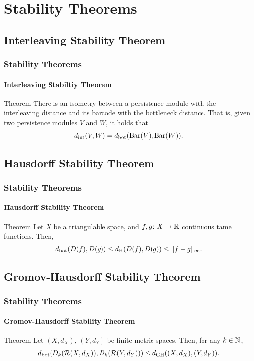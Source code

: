 \documentclass[aspectratio=169]{beamer}
\begin{document}
\section{Stability Theorems}

\subsection{Interleaving Stability Theorem}

\begin{frame}
  \frametitle{Stability Theorems}
  \framesubtitle{Interleaving Stabiltiy Theorem}
  
  \begin{block}{Theorem}
    There is an isometry between a persistence module with the interleaving distance and its barcode with the bottleneck distance. That is, given two persistence modules $ V $ and $ W $, it holds that
    \begin{equation}
        d_{\operatorname{int}} (V, W) = d_{\operatorname{bot}} (\operatorname{Bar}(V), \operatorname{Bar}(W)).
    \end{equation} 
  \end{block}
\end{frame}

\subsection{Hausdorff Stability Theorem}

\begin{frame}
  \frametitle{Stability Theorems}
  \framesubtitle{Hausdorff Stability Theorem}
  \begin{block}{Theorem}
    Let $ X $ be a triangulable space, and $ f, g\colon X \to \mathbb R $ continuous tame functions. Then,
    \begin{align}
        d_{\operatorname{bot}} (D(f), D(g)) \leq d_{\operatorname{H}}(D(f), D(g)) \leq \|f-g\|_\infty.
    \end{align}
  \end{block}
\end{frame}

\subsection{Gromov-Hausdorff Stability Theorem}

\begin{frame}
  \frametitle{Stability Theorems}
  \framesubtitle{Gromov-Hausdorff Stability Theorem}

  \begin{block}{Theorem}
    Let $ (X, d_X) $, $ (Y, d_Y) $ be finite metric spaces. Then, for any $ k \in \mathbb N$, 
    \begin{equation}
        d_{\operatorname{bot}}( D_k(\mathcal{R}(X, d_X)), D_k(\mathcal{R}(Y, d_Y))) \leq d_{\operatorname{GH}}((X, d_X), (Y, d_Y)).
    \end{equation}
  \end{block}

\end{frame}
\end{document}
